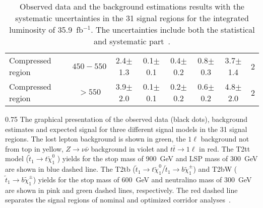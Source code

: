 \begin{table}[htb]
\begin{tabular}{|c|c|c|c|c|c|c|c|c|c|}
\multicolumn{3}{|l|}{Compressed region} & $450-550$ & 2.4$\pm$1.3 & 0.1$\pm$0.1 & 0.4$\pm$0.2 & 0.8$\pm$0.3 & 3.7$\pm$1.4 & 2 \\
\multicolumn{3}{|l|}{Compressed region} &    $>550$ & 3.9$\pm$2.0 & 0.1$\pm$0.1 & 0.2$\pm$0.2 & 0.6$\pm$0.2 & 4.8$\pm$2.0 & 2 \\
\hline
\end{tabular}
\caption{\label{tab:resultsAll} Observed data and the background estimations results with the systematic uncertainties in the 31 signal regions for the integrated luminosity of 35.9~fb$^{-1}$. The uncertainties include both the statistical and systematic part~\cite{Sirunyan:2017xse}. }
\end{table}


                 {0.75}       %
                 { The graphical presentation of the observed data (black dots), background estimates and expected signal for three different signal models in the 31 signal regions. The lost lepton background is shown in green, the $1 \ell$ background not from top in yellow, $Z \to \nu \bar{\nu}$ background in violet and $t\bar{t} \to 1\ell$ in red. The T2tt model ($\tilde{t}_{1} \to t \tilde{\chi}^{0}_{1}$ ) yields for the stop mass of 900~GeV and LSP mass of 300~GeV are shown in blue dashed line. The T2tb ($\tilde{t}_{1} \to t \tilde{\chi}^{0}_{1} /\tilde{t}_{1} \to b \tilde{\chi}^{\pm}_{1}$) and T2bW ($\tilde{t}_{1} \to b \tilde{\chi}^{\pm}_{1}$) yields for the stop mass of 600~GeV and neutralino mass of 300~GeV are shown in pink and green dashed lines, respectively. The red dashed line separates the signal regions of nominal and optimized corridor analyses~\cite{Sirunyan:2017xse}. }

